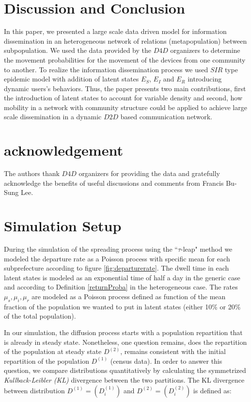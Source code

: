 \documentclass[review]{elsarticle}
\begin{document}
\section{Discussion and Conclusion}\label{sec:conclusion}

In this paper, we presented a large scale data driven model for information dissemination in an heterogeneous network of relations (metapopulation) between subpopulation. We used the data provided by the $D4D$ organizers to determine the movement probabilities for the movement of the devices from one community to another. To realize the information dissemination process we used $SIR$ type epidemic model with addition of latent states $E_{S}$, $E_{I}$ and $E_{R}$ introducing dynamic users's behaviors. Thus, the paper presents two main contributions, first the introduction of latent states to account for variable density and second, how mobility in a network with community structure could be applied to achieve large scale dissemination in a dynamic $D2D$ based communication network.

\section{acknowledgement}\label{sec:acknowledgement}
The authors thank $D4D$ organizers for providing the data and gratefully acknowledge the benefits of useful discussions and comments from Francis Bu-Sung Lee.

\appendix
\section{Simulation Setup}\label{AppendixA}

During the simulation of the spreading process using the ``$\tau$-leap" method we modeled the departure rate as a Poisson process with specific mean for each subprefecture according to figure \ref{fig:departurerate}. The dwell time  in each latent states is modeled as an exponential time of half a day in the generic case and according to Definition \ref{returnProba} in the heterogeneous case. The rates $\mu_s, \mu_i, \mu_r$ are modeled as a Poisson process defined as function of the mean fraction of the population we wanted to put in latent states (either 10\% or 20\% of the total population). 

In our simulation, the diffusion process starts with a population repartition that is already in steady state. Nonetheless, one question remains, does the repartition of the population at steady state $D^{(2)}$, remains consistent with the initial repartition of the population $D^{(1)}$ (census data). In order to answer this question, we compare distributions quantitatively by calculating the symmetrized \textit{Kullback\hyp{}Leibler (KL)} divergence between the two partitions. The KL divergence between distribution $D^{(1)}=(D_i^{(1)})$ and $D^{(2)}=(D_i^{(2)})$ is defined as:
\end{document}
